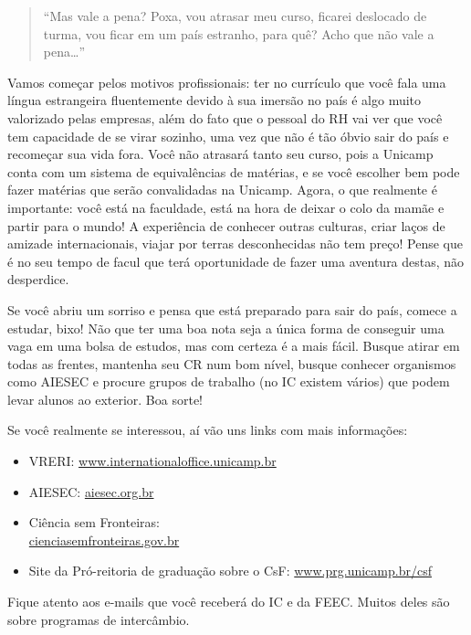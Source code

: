 \begin{quote}
``Mas vale a pena? Poxa, vou atrasar meu curso, ficarei deslocado de turma, vou
ficar em um país estranho, para quê? Acho que não vale a pena{\dots}''
\end{quote}
Vamos começar pelos motivos profissionais: ter no currículo que você fala uma
língua estrangeira fluentemente devido à sua imersão no país é algo muito
valorizado pelas empresas, além do fato que o pessoal do RH vai ver que você tem
capacidade de se virar sozinho, uma vez que não é tão óbvio sair do país e
recomeçar sua vida fora. Você não atrasará tanto seu curso, pois a Unicamp conta
com um sistema de equivalências de matérias, e se você escolher bem pode fazer
matérias que serão convalidadas na Unicamp. Agora, o que realmente é importante:
você está na faculdade, está na hora de deixar o colo da mamãe e partir para o
mundo! A experiência de conhecer outras culturas, criar laços de amizade
internacionais, viajar por terras desconhecidas não tem preço! Pense que é no
seu tempo de facul que terá oportunidade de fazer uma aventura destas, não
desperdice.

Se você abriu um sorriso e pensa que está preparado para sair do país, comece a
estudar, bixo! Não que ter uma boa nota seja a única forma de conseguir uma vaga
em uma bolsa de estudos, mas com certeza é a mais fácil.  Busque atirar em todas
as frentes, mantenha seu CR num bom nível, busque conhecer organismos como
AIESEC e procure grupos de trabalho (no IC existem vários) que podem levar
alunos ao exterior. Boa sorte!

Se você realmente se interessou, aí vão uns links com mais informações:

\begin{itemize}
    \item  VRERI: \url{www.internationaloffice.unicamp.br}
    \item  AIESEC: \url{aiesec.org.br}
    \item  Ciência sem Fronteiras: \\\url{cienciasemfronteiras.gov.br}
    \item  Site da Pró-reitoria de graduação sobre o CsF: \url{www.prg.unicamp.br/csf}
\end{itemize}

Fique atento aos e-mails que você receberá do IC e da FEEC. Muitos deles são
sobre programas de intercâmbio.
